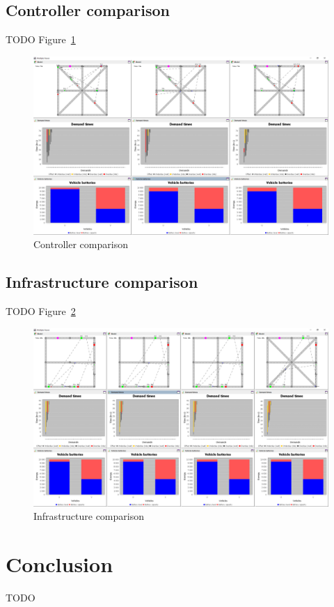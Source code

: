\documentclass{article}
\begin{document}
    \subsection{Controller comparison}
    TODO Figure~\ref{fig:5}

    \begin{figure}
        \centering
        \includegraphics[width=\textwidth]{../../screenshots/controller-comparison.png}
        \caption{Controller comparison}
        \label{fig:5}
    \end{figure}

    \subsection{Infrastructure comparison}
    TODO Figure~\ref{fig:6}

    \begin{figure}
        \centering
        \includegraphics[width=\textwidth]{../../screenshots/infrastructure-comparison.png}
        \caption{Infrastructure comparison}
        \label{fig:6}
    \end{figure}

    \section{Conclusion}
    \label{sec:con}
    TODO

    
    
\end{document}
